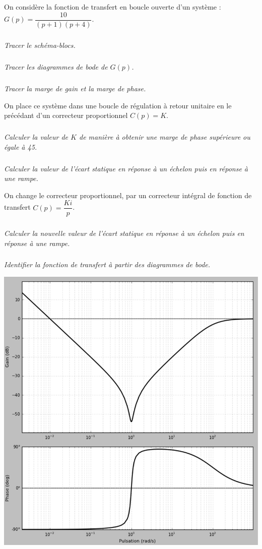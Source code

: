 \documentclass[10pt,fleqn]{article} %
\begin{document}

\vspace{8cm}
\pagestyle{fancy}
\thispagestyle{plain}

\def\columnseprulecolor{\color{ocre}}
\setlength{\columnseprule}{0.4pt} 

\def\pathfig{images}

\begin{multicols}{2}
On considère la fonction de transfert en boucle ouverte d’un système :
$G(p)=\dfrac{10}{\left( p+1\right)\left( p+4\right)}$.

\subparagraph{}\textit{Tracer le schéma-blocs.}

\subparagraph{}\textit{Tracer les diagrammes de bode de $G(p)$.}
\subparagraph{}\textit{Tracer la marge de gain et la marge de phase.}

On place ce système dans une boucle de régulation à retour unitaire en le précédant d’un correcteur proportionnel $C(p)=K$.

\subparagraph{}\textit{Calculer la valeur de $K$ de manière à obtenir une marge de phase supérieure ou égale à 45\degres.}
\subparagraph{}\textit{Calculer la valeur de l’écart statique en réponse à un échelon puis en réponse à une rampe.}

On change le correcteur proportionnel, par un correcteur intégral de fonction de transfert $C(p)=\dfrac{Ki}{p}$.

\subparagraph{}\textit{Calculer la nouvelle valeur de l’écart statique en réponse à un échelon puis en réponse à une rampe.}

 
\end{multicols}

\newpage

\subparagraph{}\textit{Identifier la fonction de transfert à partir des diagrammes de bode.}



\begin{center}
\includegraphics[width=.8\linewidth]{images/fig_01}
\end{center}
\end{document}

